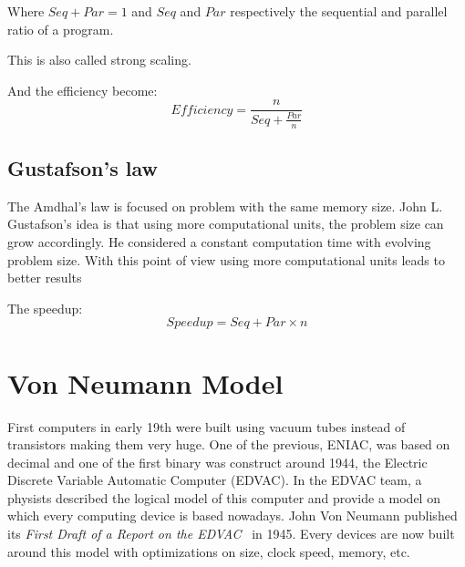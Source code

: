 Where $Seq + Par = 1$ and $Seq$ and $Par$ respectively the sequential and parallel ratio of a program.

This is also called strong scaling.  

And the efficiency become:
\begin{equation}
Efficiency = \frac{n}{Seq + \frac{Par}{n}}
\end{equation}

\subsection{Gustafson's law}

The Amdhal's law is focused on problem with the same memory size. 
John L. Gustafson's idea is that using more computational units, the problem size can grow accordingly. 
He considered a constant computation time with evolving problem size. 
With this point of view using more computational units leads to better results 

The speedup:
\begin{equation}
Speedup = Seq + Par \times n
\end{equation}

\section{Von Neumann Model}

First computers in early 19th were built using vacuum tubes instead of transistors making them very huge. 
One of the previous, ENIAC, was based on decimal and one of the first binary was construct around 1944, the Electric Discrete Variable Automatic Computer (EDVAC). 
In the EDVAC team, a physists described the logical model of this computer and provide a model on which every computing device is based nowadays. 
John Von Neumann published its \textit{First Draft of a Report on the EDVAC}~\cite{von1993first} in 1945. 
Every devices are now built around this model with optimizations on size, clock speed, memory, etc. 

